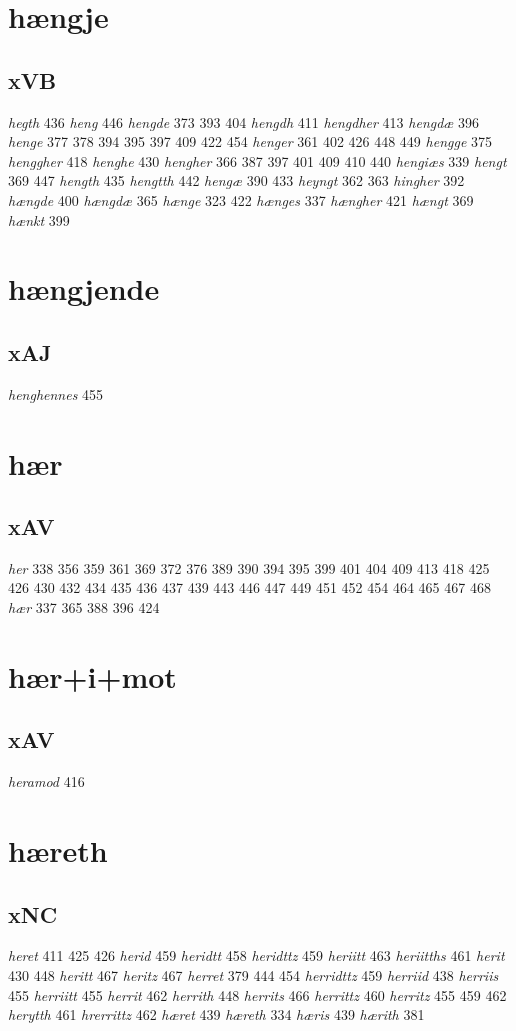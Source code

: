 \documentclass[a4paper,twocolumn]{article}
\begin{document}
\section{hængje}
\label{sec:orgddae121}
\subsection{xVB}
\label{sec:org72e8a5b}
\emph{hegth} 436 \emph{heng} 446 \emph{hengde} 373 393 404 \emph{hengdh} 411 \emph{hengdher} 413 \emph{hengdæ} 396 \emph{henge} 377 378 394 395 397 409 422 454 \emph{henger} 361 402 426 448 449 \emph{hengge} 375 \emph{henggher} 418 \emph{henghe} 430 \emph{hengher} 366 387 397 401 409 410 440 \emph{hengiæs} 339 \emph{hengt} 369 447 \emph{hength} 435 \emph{hengtth} 442 \emph{hengæ} 390 433 \emph{heyngt} 362 363 \emph{hingher} 392 \emph{hængde} 400 \emph{hængdæ} 365 \emph{hænge} 323 422 \emph{hænges} 337 \emph{hængher} 421 \emph{hængt} 369 \emph{hænkt} 399 
\section{hængjende}
\label{sec:org64a6393}
\subsection{xAJ}
\label{sec:org23c30b7}
\emph{henghennes} 455 
\section{hær}
\label{sec:org1e6e292}
\subsection{xAV}
\label{sec:org608329f}
\emph{her} 338 356 359 361 369 372 376 389 390 394 395 399 401 404 409 413 418 425 426 430 432 434 435 436 437 439 443 446 447 449 451 452 454 464 465 467 468 \emph{hær} 337 365 388 396 424 
\section{hær+i+mot}
\label{sec:orgae9748f}
\subsection{xAV}
\label{sec:org9fd109f}
\emph{heramod} 416 
\section{hæreth}
\label{sec:org0d2cb2b}
\subsection{xNC}
\label{sec:orgc4b81d5}
\emph{heret} 411 425 426 \emph{herid} 459 \emph{heridtt} 458 \emph{heridttz} 459 \emph{heriitt} 463 \emph{heriitths} 461 \emph{herit} 430 448 \emph{heritt} 467 \emph{heritz} 467 \emph{herret} 379 444 454 \emph{herridttz} 459 \emph{herriid} 438 \emph{herriis} 455 \emph{herriitt} 455 \emph{herrit} 462 \emph{herrith} 448 \emph{herrits} 466 \emph{herrittz} 460 \emph{herritz} 455 459 462 \emph{herytth} 461 \emph{hrerrittz} 462 \emph{hæret} 439 \emph{hæreth} 334 \emph{hæris} 439 \emph{hærith} 381 
\end{document}
